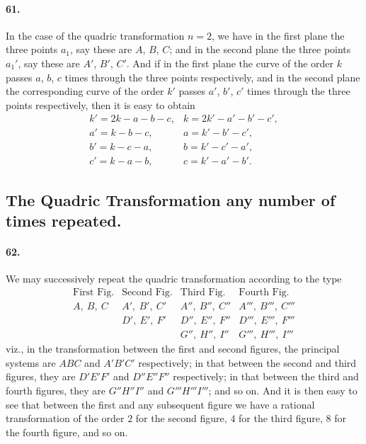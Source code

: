 \documentclass[11pt]{article}
\begin{document}
\medskip

\paragraph{61.}
In the case of the quadric transformation $n=2$, we have in the first
plane the three points $a_{1}$, say these are $A$, $B$, $C$; and in the
second plane the three points $a_{1}'$, say these are $A'$, $B'$, $C'$.
And if in the first plane the curve of the order $k$ passes $a$, $b$, $c$
times through the three points respectively, and in the second plane the
corresponding curve of the order $k'$ passes $a'$, $b'$, $c'$ times
through the three points respectively, then it is easy to obtain
\[
\begin{array}{ll}
k' = 2k-a-b-c, & k = 2k'-a'-b'-c',\\
a' = k-b-c, & a = k'-b'-c',\\
b' = k-c-a, & b = k'-c'-a',\\
c' = k-a-b, & c = k'-a'-b'.
\end{array}
\]

\bigskip

\subsection*{The Quadric Transformation any number of times repeated.}

\paragraph{62.}
We may successively repeat the quadric transformation according to the
type
\[
\begin{array}{llll}
\text{First Fig.} & \text{Second Fig.} & \text{Third Fig.} & \text{Fourth Fig.}\\
A,\ B,\ C         & A',\ B',\ C'        & A'',\ B'',\ C''     & A''',\ B''',\ C'''\\
                  & D',\ E',\ F'        & D'',\ E'',\ F''      & D''',\ E''',\ F'''\\
                  &                     & G'',\ H'',\ I''     & G''',\ H''',\ I'''
\end{array}
\]
viz., in the transformation between the first and second figures, the
principal systems are $ABC$ and $A'B'C'$ respectively; in that between
the second and third figures, they are $D'E'F'$ and $D''E''F''$
respectively; in that between the third and fourth figures, they are
$G''H''I''$ and $G'''H'''I'''$; and so on. And it is then easy to see
that between the first and any subsequent figure we have a rational
transformation of the order $2$ for the second figure, $4$ for the third
figure, $8$ for the fourth figure, and so on.
\end{document}
